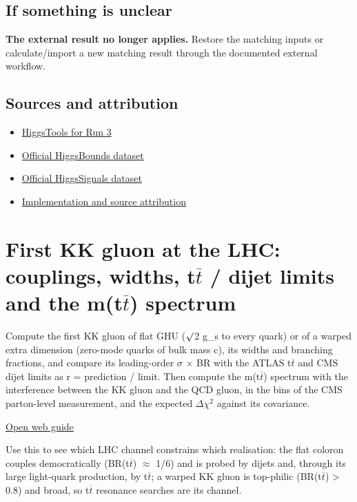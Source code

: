 \documentclass[11pt,a4paper]{article}
\begin{document}
\subsection*{If something is unclear}
\textbf{The external result no longer applies.} Restore the matching inputs or calculate/import a new matching result through the documented external workflow.

\subsection*{Sources and attribution}
\begin{itemize}
\item \href{https://arxiv.org/abs/2608.05401}{HiggsTools for Run 3}
\item \href{https://gitlab.com/higgsbounds/hbdataset}{Official HiggsBounds dataset}
\item \href{https://gitlab.com/higgsbounds/hsdataset}{Official HiggsSignals dataset}
\item \href{https://github.com/karlesmarin/ghu-lab/blob/main/src/modules/higgstools_adapter.mjs}{Implementation and source attribution}
\end{itemize}
\section{First KK gluon at the LHC: couplings, widths, t\ensuremath{\overline{t}} / dijet limits and the m(t\ensuremath{\overline{t}}) spectrum}
Compute the first KK gluon of flat GHU (\ensuremath{\surd}2 g\_s to every quark) or of a warped extra dimension (zero-mode quarks of bulk mass c), its widths and branching fractions, and compare its leading-order \ensuremath{\sigma} \ensuremath{\times} BR with the ATLAS t\ensuremath{\overline{t}} and CMS dijet limits as r = prediction / limit. Then compute the m(t\ensuremath{\overline{t}}) spectrum with the interference between the KK gluon and the QCD gluon, in the bins of the CMS parton-level measurement, and the expected \ensuremath{\Delta}\ensuremath{\chi}\ensuremath{{}^{2}} against its covariance.

\href{https://karlesmarin.github.io/ghu-explorer/guide/kkgluon/index.html}{Open web guide}

Use this to see which LHC channel constrains which realisation: the flat coloron couples democratically (BR(t\ensuremath{\overline{t}}) \ensuremath{\approx} 1/6) and is probed by dijets and, through its large light-quark production, by t\ensuremath{\overline{t}}; a warped KK gluon is top-philic (BR(t\ensuremath{\overline{t}}) > 0.8) and broad, so t\ensuremath{\overline{t}} resonance searches are its channel.
\end{document}
